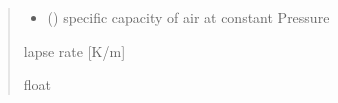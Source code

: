 \documentclass[letterpaper,10pt,english]{sphinxmanual}
\begin{document}
\begin{fulllineitems}
\begin{quote}
\begin{description}
\begin{itemize}
\item {}
\sphinxAtStartPar
{} () \textendash{} specific capacity of air at constant Pressure

\end{itemize}

\sphinxAtStartPar
{} \textendash{} lapse rate {[}K/m{]}

\sphinxAtStartPar
float

\end{description}\end{quote}

\end{fulllineitems}

\end{document}
